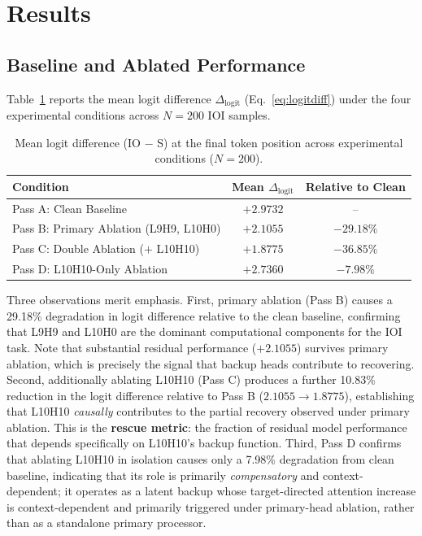 \documentclass[12pt,a4paper]{article}
\begin{document}
\section{Results}
\label{sec:results}

\subsection{Baseline and Ablated Performance}
\label{subsec:baselines}

Table~\ref{tab:logit_diffs} reports the mean logit difference
$\Delta_\text{logit}$ (Eq.~\ref{eq:logitdiff}) under the four experimental
conditions across $N=200$ IOI samples.

\begin{table}[!htbp]
  \centering
  \caption{Mean logit difference (IO $-$ S) at the final token position across experimental conditions ($N=200$).}
  \label{tab:logit_diffs}
  \begin{tabular}{lcc}
    \toprule
    \textbf{Condition} & \textbf{Mean $\Delta_\text{logit}$} & \textbf{Relative to Clean} \\
    \midrule
    Pass A: Clean Baseline                  & $+2.9732$ & --            \\
    Pass B: Primary Ablation (L9H9, L10H0)  & $+2.1055$ & $-29.18\%$   \\
    Pass C: Double Ablation ($+$ L10H10)    & $+1.8775$ & $-36.85\%$   \\
    Pass D: L10H10-Only Ablation            & $+2.7360$ & $-7.98\%$    \\
    \bottomrule
  \end{tabular}
\end{table}

Three observations merit emphasis. First, primary ablation (Pass B) causes a
29.18\% degradation in logit difference relative to the clean baseline, confirming
that L9H9 and L10H0 are the dominant computational components for the IOI task.
Note that substantial residual performance ($+2.1055$) survives primary ablation,
which is precisely the signal that backup heads contribute to recovering.
Second, additionally ablating L10H10 (Pass C) produces a further 10.83\% reduction
in the logit difference relative to Pass B ($2.1055 \to 1.8775$), establishing
that L10H10 \emph{causally} contributes to the partial recovery observed under
primary ablation. This is the \textbf{rescue metric}: the fraction of residual
model performance that depends specifically on L10H10's backup function. Third,
Pass D confirms that ablating L10H10 in isolation causes only a 7.98\% degradation
from clean baseline, indicating that its role is primarily \emph{compensatory}
and context-dependent; it operates as a latent backup whose target-directed attention
increase is context-dependent and primarily triggered under primary-head ablation,
rather than as a standalone primary processor.
\end{document}
